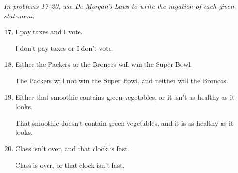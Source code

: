 \emph{In problems 17--20, use De Morgan's Laws to write the negation of each given statement.}
\begin{enumerate}
\setcounter{enumi}{16}

\item I pay taxes and I vote. \\ 
\begin{framed}
I don't pay taxes or I don't vote.
\end{framed}

\item Either the Packers or the Broncos will win the Super Bowl. \\ 
\begin{framed}
The Packers will not win the Super Bowl, and neither will the Broncos.
\end{framed}

\item Either that smoothie contains green vegetables, or it isn't as healthy as it looks. \\ 
\begin{framed}
That smoothie doesn't contain green vegetables, and it is as healthy as it looks.
\end{framed}

\item Class isn't over, and that clock is fast. \\ 
\begin{framed}
Class is over, or that clock isn't fast.
\end{framed}
\end{enumerate}
\pagebreak

